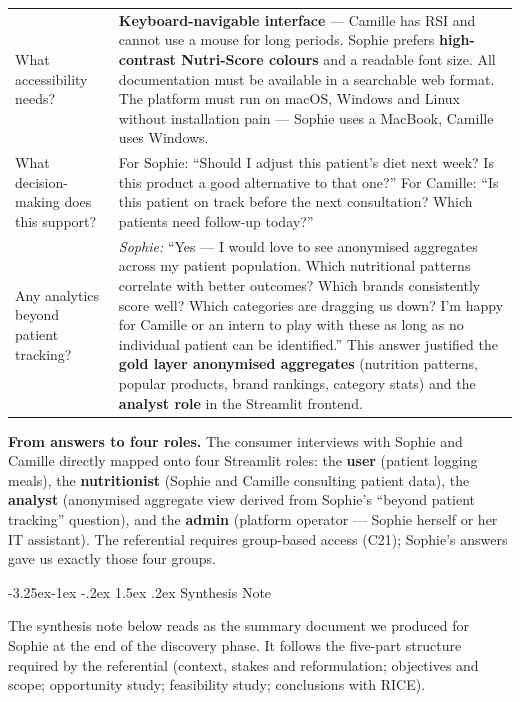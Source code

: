 \documentclass[a4paper,11pt,oneside,openany]{report}
\makeatletter
\renewcommand\subsection{\@startsection{subsection}{2}{\z@}%
  {-3.25ex\@plus -1ex \@minus -.2ex}%
  {1.5ex \@plus .2ex}%
  {\normalfont\large\bfseries\color{ntdarkgreen}}}
\makeatother
\begin{document}
\begin{table}[H]
\begin{tabularx}{\textwidth}{L{4cm} X}
\\
\addlinespace
What accessibility needs? &
\textbf{Keyboard-navigable interface} --- Camille has RSI and
cannot use a mouse for long periods. Sophie prefers
\textbf{high-contrast Nutri-Score colours} and a readable font
size. All documentation must be available in a searchable web
format. The platform must run on macOS, Windows and Linux without
installation pain --- Sophie uses a MacBook, Camille uses Windows.
\\
\addlinespace
What decision-making does
this support? &
For Sophie: ``Should I adjust this patient's diet next week? Is
this product a good alternative to that one?''
For Camille: ``Is this patient on track before the next
consultation? Which patients need follow-up today?''
\\
\addlinespace
Any analytics beyond
patient tracking? &
\textit{Sophie:} ``Yes --- I would love to see anonymised
aggregates across my patient population. Which nutritional
patterns correlate with better outcomes? Which brands consistently
score well? Which categories are dragging us down? I'm happy for
Camille or an intern to play with these as long as no individual
patient can be identified.''
This answer justified the \textbf{gold layer anonymised
aggregates} (nutrition patterns, popular products, brand rankings,
category stats) and the \textbf{analyst role} in the Streamlit
frontend.
\\
\bottomrule
\end{tabularx}
\end{table}

\noindent\textbf{From answers to four roles.} The consumer
interviews with Sophie and Camille directly mapped onto four
Streamlit roles: the \textbf{user} (patient logging meals), the
\textbf{nutritionist} (Sophie and Camille consulting patient
data), the \textbf{analyst} (anonymised aggregate view derived
from Sophie's ``beyond patient tracking'' question), and the
\textbf{admin} (platform operator --- Sophie herself or her IT
assistant). The referential requires group-based access
(C21); Sophie's answers gave us exactly those four groups.

\subsection{Synthesis Note}

The synthesis note below reads as the summary document we produced
for Sophie at the end of the discovery phase. It follows the
five-part structure required by the referential (context, stakes
and reformulation; objectives and scope; opportunity study;
feasibility study; conclusions with RICE).
\end{document}
